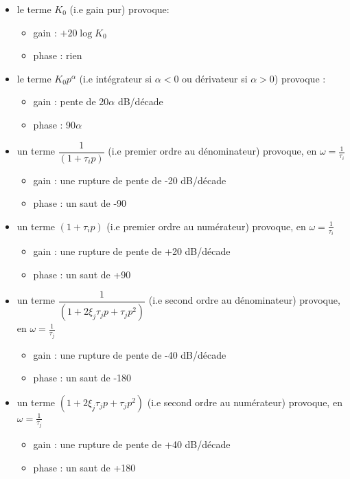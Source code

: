 \begin{itemize}
    \item le terme $K_0$ (i.e gain pur) provoque:
        \begin{itemize}
            \item gain  : $+20\log{K_0}$
            \item phase : rien 
        \end{itemize}
    \item le terme $K_0p^{\alpha}$ (i.e intégrateur si $\alpha<0$ ou dérivateur si $\alpha>0$)
        provoque :
        \begin{itemize}
            \item gain  : pente de 20$\alpha$ dB/décade 
            \item phase : 90$\alpha$\degree
        \end{itemize}
    \item un terme $\dfrac{1}{(1+\tau_ip)}$ (i.e premier ordre au dénominateur) provoque, en $\omega=\frac{1}{\tau_i}$
        \begin{itemize}
            \item gain  : une rupture de pente de -20 dB/décade 
            \item phase : un saut de -90\degree
        \end{itemize}
    \item un terme $(1+\tau_ip)$ (i.e premier ordre au numérateur) provoque, en $\omega=\frac{1}{\tau_i}$
        \begin{itemize}
            \item gain  : une rupture de pente de +20 dB/décade 
            \item phase : un saut de +90\degree
        \end{itemize}
    \item un terme $\dfrac{1}{(1+2\xi_j\tau_jp+\tau_jp^2)}$ (i.e second ordre au dénominateur) provoque, en $\omega=\frac{1}{\tau_j}$
        \begin{itemize}
            \item gain  : une rupture de pente de -40 dB/décade 
            \item phase : un saut de -180\degree
        \end{itemize}
    \item un terme $(1+2\xi_j\tau_jp+\tau_jp^2)$ (i.e second ordre au numérateur) provoque, en $\omega=\frac{1}{\tau_j}$
        \begin{itemize}
            \item gain  : une rupture de pente de +40 dB/décade 
            \item phase : un saut de +180\degree
        \end{itemize}
\end{itemize}

